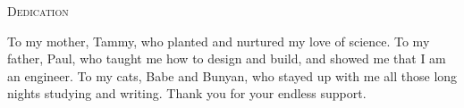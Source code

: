 \vspace*{\fill}
\begin{center}
{\LARGE\textsc{Dedication}}\vspace{0.5cm}

To my mother, Tammy, who planted and nurtured my love of science. To my father, Paul, who taught me how to design and build, and showed me that I am an engineer. To my cats, Babe and Bunyan, who stayed up with me all those long nights studying and writing. Thank you for your endless support.

\end{center}
\vspace{\fill}
